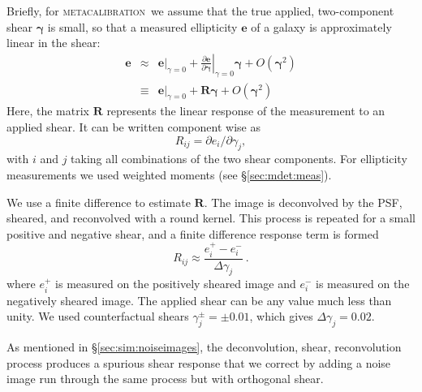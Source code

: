 \documentclass[twocolumn,twocolappendix,astrosym]{openjournal}
\newcommand{\mcal}{\textsc{metacalibration}}
\begin{document}
Briefly, for \mcal\ we assume that the true applied, two-component shear
$\boldsymbol{\gamma}$ is small, so that a measured ellipticity $\boldsymbol{e}$
of a galaxy is approximately linear in the shear:
\begin{eqnarray} \label{eq:response}
\boldsymbol{e} & \approx & \left.\boldsymbol{e}\right|_{\gamma=0} +
                           \left.\frac{\partial \boldsymbol{e}}{\partial\boldsymbol\gamma}\right|_{\gamma=0} \boldsymbol\gamma +
                           O(\boldsymbol\gamma^2)\nonumber\\
               & \equiv  & \left.\boldsymbol{e}\right|_{\gamma=0} +
                           \boldsymbol{R} \boldsymbol\gamma +
                           O(\boldsymbol\gamma^2)
\end{eqnarray}
Here, the matrix $\boldsymbol{R}$ represents the linear response of the
measurement to an applied shear. It can be written component wise as
\begin{equation}
R_{ij}=\partial e_i /\partial \gamma_j,
\end{equation}
with $i$ and $j$ taking all combinations of the two shear components.  For ellipticity
measurements we used weighted moments (see \S \ref{sec:mdet:meas}).

We use a finite difference to estimate $\boldsymbol{R}$.  The image is
deconvolved by the PSF, sheared, and reconvolved with a round kernel.  This
process is repeated for a small positive and negative shear, and a finite
difference response term is formed
\begin{equation}
R_{ij} \approx \frac{e_i^{+} - e_i^{-}}{\Delta\gamma_j}\ .
\end{equation}
where $e_i^{+}$ is measured on the positively sheared image and $e_i^{-}$ is
measured on the negatively sheared image.  The applied
shear can be any value much less than unity. We used counterfactual
shears $\gamma_j^{\pm} = \pm0.01$,
which gives $\Delta\gamma_j = 0.02$.

As mentioned in \S \ref{sec:sim:noiseimages}, the deconvolution, shear,
reconvolution process produces a spurious shear response that we correct by
adding a noise image run through the same process but with orthogonal shear.
\end{document}
